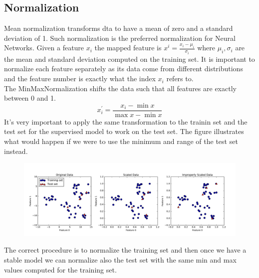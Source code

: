 \documentclass{article}
\begin{document}
\subsection{Normalization}
Mean normalization transforms dta to have a mean of zero and a standard deviation of 1. Such normalization is the preferred normalization for Neural Networks. Given a feature $ x_i $ the mapped feature is $ x^i  = \frac{x_i-\mu_i}{\sigma_i}$ where $ \mu_i, \sigma_i $ are the mean and standard deviation computed on the training set. It is important to normalize each feature separately as its data come from different distributions and the feature number is exactly what the index $ x_i $ refers to.\\
The MinMaxNormalization shifts the data such that all features are exactly between 0 and 1. 
\[ 
    x_{i}^{'}= \frac{x_i-\min{x}}{\max{x} - \min{x}} 
\]
It's very important to apply the same transformation to the trainin set and the test set for the supervised model to work on the test set. The figure illustrates what would happen if we were to use the minimum and range of the test set instead.
\begin{figure}[htbp]
    \centering
    \includegraphics[width=13cm]{normalization-effect.png}
\end{figure}
The correct procedure is to normalize the training set and then once we have a stable model we can normalize also the test set with the same min and max values computed for the training set.
\end{document}
